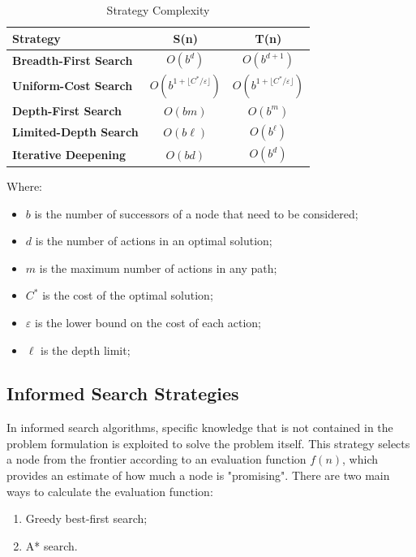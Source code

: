 \documentclass{article}
\begin{document}
\begin{table}[h]
    \centering
    \begin{tabular}{l||c|c}
        Strategy & S(n) & T(n) \\ \hline \hline
        \textbf{Breadth-First Search} & $O(b^d)$  & $O(b^{d+1})$ \\ \hline
        \textbf{Uniform-Cost Search} & $O(b^{1+\lfloor C^*/\varepsilon \rfloor})$ & $O(b^{1+\lfloor C^*/\varepsilon \rfloor})$ \\ \hline
        \textbf{Depth-First Search} & $O(bm)$ & $O(b^m)$ \\ \hline
        \textbf{Limited-Depth Search} & $O(b\ell)$ & $O(b^\ell)$ \\ \hline
        \textbf{Iterative Deepening} & $O(bd)$ & $O(b^d)$ \\
    \end{tabular}
    \caption{Strategy Complexity}
    \label{tab:strategy_complexity}
\end{table}

Where:
\begin{itemize}
    \item $b$ is the number of successors of a node that need to be considered;
    \item $d$ is the number of actions in an optimal solution;
    \item $m$ is the maximum number of actions in any path;
    \item $C^*$ is the cost of the optimal solution;
    \item $\varepsilon$ is the lower bound on the cost of each action;
    \item $\ell$ is the depth limit;
\end{itemize}

\subsection{Informed Search Strategies}
In informed search algorithms, specific knowledge that is not contained in the problem formulation is exploited to solve the problem itself. This strategy selects a node from the frontier according to an evaluation function $f(n)$, which provides an estimate of how much a node is "promising". There are two main ways to calculate the evaluation function:
\begin{enumerate}
    \item Greedy best-first search;
    \item A* search.
\end{enumerate}
\end{document}
